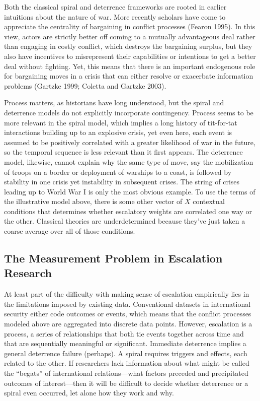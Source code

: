 \documentclass[
]{article}
\begin{document}
Both the classical spiral and deterrence frameworks are rooted in
earlier intuitions about the nature of war. More recently scholars have
come to appreciate the centrality of bargaining in conflict processes
(Fearon 1995). In this view, actors are strictly better off coming to a
mutually advantageous deal rather than engaging in costly conflict,
which destroys the bargaining surplus, but they also have incentives to
misrepresent their capabilities or intentions to get a better deal
without fighting. Yet, this means that there is an important endogenous
role for bargaining moves in a crisis that can either resolve or
exacerbate information problems (Gartzke 1999; Coletta and Gartzke
2003).

Process matters, as historians have long understood, but the spiral and
deterrence models do not explicitly incorporate contingency. Process
seems to be more relevant in the spiral model, which implies a long
history of tit-for-tat interactions building up to an explosive crisis,
yet even here, each event is assumed to be positively correlated with a
greater likelihood of war in the future, so the temporal sequence is
less relevant than it first appears. The deterrence model, likewise,
cannot explain why the same type of move, say the mobilization of troops
on a border or deployment of warships to a coast, is followed by
stability in one crisis yet instability in subsequent crises. The string
of crises leading up to World War I is only the most obvious example. To
use the terms of the illustrative model above, there is some other
vector of \(X\) contextual conditions that determines whether escalatory
weights are correlated one way or the other. Classical theories are
underdetermined because they've just taken a coarse average over all of
those conditions.

\subsection{The Measurement Problem in Escalation
Research}\label{the-measurement-problem-in-escalation-research}

At least part of the difficulty with making sense of escalation
empirically lies in the limitations imposed by existing data.
Conventional datasets in international security either code outcomes or
events, which means that the conflict processes modeled above are
aggregated into discrete data points. However, escalation is a process,
a series of relationships that both tie events together across time and
that are sequentially meaningful or significant. Immediate deterrence
implies a general deterrence failure (perhaps). A spiral requires
triggers and effects, each related to the other. If researchers lack
information about what might be called the ``begats'' of international
relations---what factors preceded and precipitated outcomes of
interest---then it will be difficult to decide whether deterrence or a
spiral even occurred, let alone how they work and why.
\end{document}

